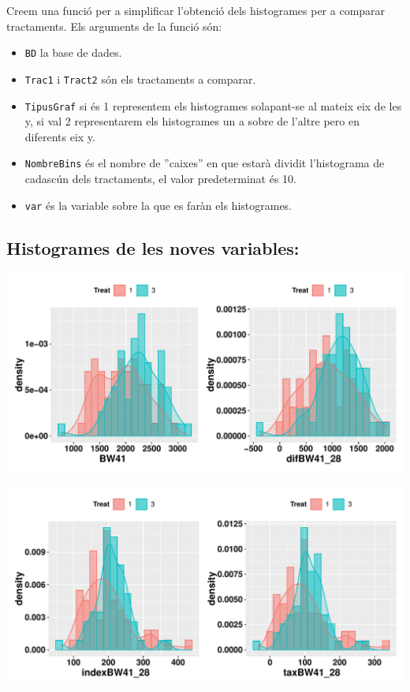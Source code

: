 \documentclass[11pt,a4paper]{article}\usepackage[]{graphicx}\usepackage[]{color}
\makeatletter
\def\maxwidth{ %
  \ifdim\Gin@nat@width>\linewidth
    \linewidth
  \else
    \Gin@nat@width
  \fi
}
\newenvironment{knitrout}{}{} %
\makeatother
\begin{document}
Creem una funció per a simplificar l'obtenció dels histogrames per a comparar tractaments.
Els arguments de la funció són:

\begin{itemize}
  \item \texttt{BD} la base de dades.
  
  \item \texttt{Trac1} i \texttt{Tract2} són els tractaments a comparar.
  
  \item \texttt{TipusGraf} si és 1 representem els histogrames solapant-se al mateix eix de les y,
               si val 2 representarem els histogrames un a sobre de l'altre pero en diferents eix y.
               
  \item \texttt{NombreBins} és el nombre de ''caixes'' en que estarà dividit l'histograma de cadascún dels tractaments, el valor predeterminat és 10.
  
  \item \texttt{var} és la variable sobre la que es faràn els histogrames.
\end{itemize}



\subsection{Histogrames de les noves variables:}

\begin{knitrout}
\color{fgcolor}
\includegraphics[width=\maxwidth]{figure/unnamed-chunk-8-1} 

\includegraphics[width=\maxwidth]{figure/unnamed-chunk-8-2} 

\end{knitrout}
\end{document}

